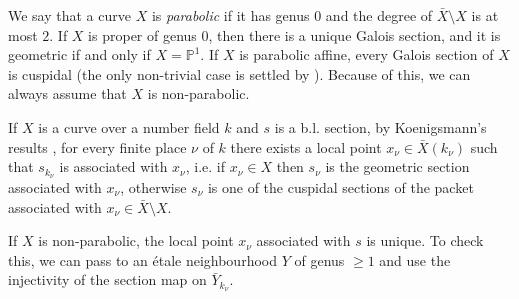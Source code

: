 \documentclass[11pt]{amsart}
\theoremstyle{plain}
\newtheorem{lemma}[theorem]{Lemma}
\theoremstyle{definition}
\newcommand{\1}{\mathbb{1}}
\newcommand{\hz}{\hat{\mathbb{Z}}}
\newcommand{\Q}{\mathbb{Q}}
\renewcommand{\P}{\mathbb{P}}
\renewcommand{\hat}{\widehat}
\begin{document}
We say that a curve $X$ is \emph{parabolic} if it has genus $0$ and the degree of $\bar{X}\setminus X$ is at most $2$. If $X$ is proper of genus $0$, then there is a unique Galois section, and it is geometric if and only if $X=\P^{1}$. If $X$ is parabolic affine, every Galois section of $X$ is cuspidal (the only non-trivial case is settled by \cite[Theorem A]{sch15}). Because of this, we can always assume that $X$ is non-parabolic.

If $X$ is a curve over a number field $k$ and $s$ is a b.l. section, by Koenigsmann's results \cite{koe05}, \cite[Proposition 1]{sti15} for every finite place $\nu$ of $k$ there exists a local point $x_{\nu}\in\bar{X}(k_{\nu})$ such that $s_{k_{\nu}}$ is associated with $x_{\nu}$, i.e. if $x_{\nu}\in X$ then $s_{\nu}$ is the geometric section associated with $x_{\nu}$, otherwise $s_{\nu}$ is one of the cuspidal sections of the packet associated with $x_{\nu}\in \bar{X}\setminus X$.

If $X$ is non-parabolic, the local point $x_{\nu}$ associated with $s$ is unique. To check this, we can pass to an étale neighbourhood $Y$ of genus $\ge 1$ and use the injectivity of the section map \cite[Proposition 75]{sti13} on $\bar{Y}_{k_{\nu}}$.

\end{document}
